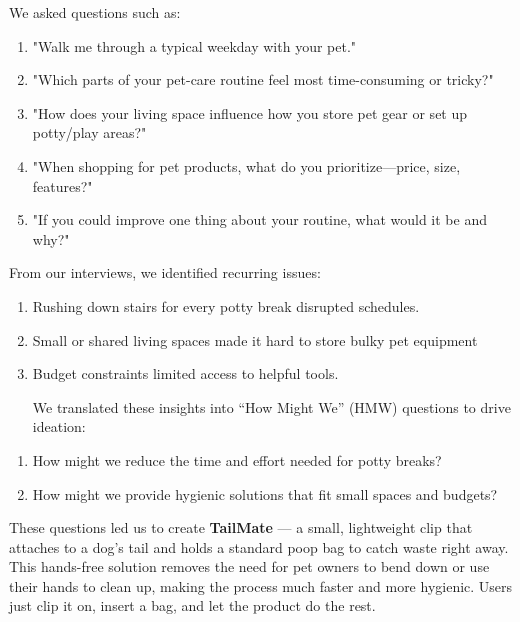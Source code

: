 \documentclass[12pt]{article}
\theoremstyle{definition} %
\theoremstyle{plain} %
\begin{document}
\vspace{.5cm}
We asked questions such as:
\vspace{.5cm} 
\noindent
\begin{enumerate}
  \item "Walk me through a typical weekday with your pet."
\item "Which parts of your pet-care routine feel most time-consuming or tricky?"
\item "How does your living space influence how you store pet gear or set up
potty/play areas?"

\item
"When shopping for pet products, what do you prioritize—price, size,
features?"

\item
"If you could improve one thing about your routine, what would it be and
why?"
\end{enumerate}
\vspace{.5cm} 
From our interviews, we identified recurring issues:
\vspace{.5cm} 
\noindent
\begin{enumerate}
  \item  Rushing down stairs for every potty break disrupted schedules.
 \item Small or shared living spaces made it hard to store bulky pet equipment
\item Budget constraints limited access to helpful tools.

We translated these insights into “How Might We” (HMW) questions to drive ideation:


\end{enumerate}
\noindent
\begin{enumerate}
  \item How might we reduce the time and effort needed for potty breaks?

\item How might we provide hygienic solutions that fit small spaces and budgets?


\end{enumerate}
\vspace{.5cm} 
These questions led us to create \textbf{TailMate} — a small, lightweight clip that attaches to
a dog’s tail and holds a standard poop bag to catch waste right away. This
hands-free solution removes the need for pet owners to bend down or use their
hands to clean up, making the process much faster and more hygienic. Users just
clip it on, insert a bag, and let the product do the rest.
\end{document}
